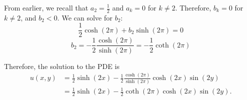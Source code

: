 \documentclass[plain]{pset}
\begin{document}
\begin{solution}
    From earlier, we recall that \(a_2 = \frac{1}{2}\) and \(a_k = 0\) for \(k \neq 2\). Therefore, \(b_k = 0\) for \(k \neq 2\), and \(b_2 < 0\). We can solve for \(b_2\):
    \[\frac{1}{2}\cosh(2\pi) + b_2\sinh(2\pi) = 0\]
    \[b_2 = -\frac{1}{2}\frac{\cosh(2\pi)}{\sinh(2\pi)} = -\frac{1}{2}\coth(2\pi)\]

    Therefore, the solution to the PDE is
    \begin{align*}
        u(x, y) & = \frac{1}{2}\sinh(2x) - \frac{1}{2}\frac{\cosh(2\pi)}{\sinh(2\pi)}\cosh(2x)\sin(2y) \\
                & = \frac{1}{2}\sinh(2x) - \frac{1}{2}\coth(2\pi)\cosh(2x)\sin(2y).
    \end{align*}
\end{solution}
\end{document}
